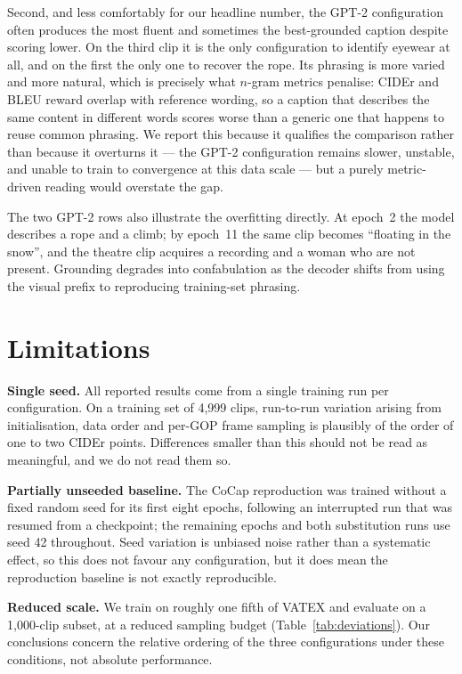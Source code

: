 \documentclass[10pt,twocolumn,letterpaper]{article}
\begin{document}
Second, and less comfortably for our headline number, the GPT-2 configuration often produces the
most fluent and sometimes the best-grounded caption despite scoring lower. On the third clip it
is the only configuration to identify eyewear at all, and on the first the only one to recover
the rope. Its phrasing is more varied and more natural, which is precisely what $n$-gram metrics
penalise: CIDEr and BLEU reward overlap with reference wording, so a caption that describes the
same content in different words scores worse than a generic one that happens to reuse common
phrasing. We report this because it qualifies the comparison rather than because it overturns
it --- the GPT-2 configuration remains slower, unstable, and unable to train to convergence at
this data scale --- but a purely metric-driven reading would overstate the gap.

The two GPT-2 rows also illustrate the overfitting directly. At epoch~2 the model describes a
rope and a climb; by epoch~11 the same clip becomes ``floating in the snow'', and the theatre
clip acquires a recording and a woman who are not present. Grounding degrades into confabulation
as the decoder shifts from using the visual prefix to reproducing training-set phrasing.

\section{Limitations}
\label{sec:limitations}

\textbf{Single seed.} All reported results come from a single training run per configuration. On
a training set of 4,999 clips, run-to-run variation arising from initialisation, data order and
per-GOP frame sampling is plausibly of the order of one to two CIDEr points. Differences smaller
than this should not be read as meaningful, and we do not read them so.

\textbf{Partially unseeded baseline.} The CoCap reproduction was trained without a fixed random
seed for its first eight epochs, following an interrupted run that was resumed from a
checkpoint; the remaining epochs and both substitution runs use seed 42 throughout. Seed
variation is unbiased noise rather than a systematic effect, so this does not favour any
configuration, but it does mean the reproduction baseline is not exactly reproducible.

\textbf{Reduced scale.} We train on roughly one fifth of VATEX and evaluate on a 1,000-clip
subset, at a reduced sampling budget (Table~\ref{tab:deviations}). Our conclusions concern the
relative ordering of the three configurations under these conditions, not absolute performance.
\end{document}
